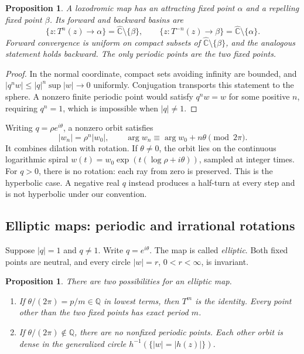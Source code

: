 \documentclass[11pt,a4paper]{article}
\newcommand{\Chat}{\widehat{\mathbb{C}}}
\newcommand{\abs}[1]{\left|#1\right|}
\theoremstyle{plain}
\newtheorem{proposition}[theorem]{Proposition}
\theoremstyle{definition}
\theoremstyle{remark}
\begin{document}
\begin{proposition}\label{prop:attraction}
A loxodromic map has an attracting fixed point $\alpha$ and a repelling
fixed point $\beta$. Its forward and backward basins are
\[
  \{z:T^n(z)\to\alpha\}=\Chat\setminus\{\beta\},\qquad
  \{z:T^{-n}(z)\to\beta\}=\Chat\setminus\{\alpha\}.
\]
Forward convergence is uniform on compact subsets of
$\Chat\setminus\{\beta\}$, and the analogous statement holds backward.
The only periodic points are the two fixed points.
\end{proposition}

\begin{proof}
In the normal coordinate, compact sets avoiding infinity are bounded, and
$\abs{q^n w}\le\abs{q}^n\sup\abs{w}\to0$ uniformly. Conjugation
transports this statement to the sphere. A nonzero finite periodic point
would satisfy $q^n w=w$ for some positive $n$, requiring $q^n=1$, which
is impossible when $\abs{q}\ne1$.
\end{proof}

Writing $q=\rho e^{i\theta}$, a nonzero orbit satisfies
\[
  \abs{w_n}=\rho^n\abs{w_0},\qquad
  \arg w_n\equiv\arg w_0+n\theta\pmod{2\pi}.
\]
It combines dilation with rotation. If $\theta\ne0$, the orbit lies on
the continuous logarithmic spiral
$w(t)=w_0\exp(t(\log\rho+i\theta))$, sampled at integer times.
For $q>0$, there is no rotation: each ray from zero is preserved. This
is the hyperbolic case. A negative real $q$ instead produces a half-turn
at every step and is not hyperbolic under our convention.

\subsection{Elliptic maps: periodic and irrational rotations}

Suppose $\abs{q}=1$ and $q\ne1$. Write $q=e^{i\theta}$. The map is
called \emph{elliptic}. Both fixed points are neutral, and every circle
$\abs{w}=r$, $0<r<\infty$, is invariant.

\begin{proposition}\label{prop:elliptic}
There are two possibilities for an elliptic map.
\begin{enumerate}
  \item If $\theta/(2\pi)=p/m\in\mathbb{Q}$ in lowest terms, then
    $T^m$ is the identity. Every point other than the two fixed points
    has exact period $m$.
  \item If $\theta/(2\pi)\notin\mathbb{Q}$, there are no nonfixed
    periodic points. Each other orbit is dense in the generalized
    circle $h^{-1}(\{\abs{w}=\abs{h(z)}\})$.
\end{enumerate}
\end{proposition}
\end{document}
